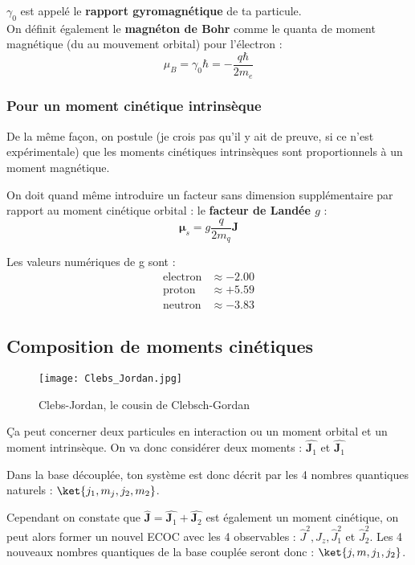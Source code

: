 \documentclass[a4paper]{report}
\begin{document}
$\gamma_0$ est appelé le \textbf{rapport gyromagnétique} de ta particule. \\

On définit également le \textbf{magnéton de Bohr} comme le quanta de moment magnétique (du au mouvement orbital) pour l'électron : 
\begin{equation}
\mu_B=\gamma_0 \hbar= -\dfrac{q \hbar}{2 m_e}
\end{equation}
\subsubsection{Pour un moment cinétique intrinsèque}
De la même façon, on postule (je crois pas qu'il y ait de preuve, si ce n'est expérimentale) que les moments cinétiques intrinsèques sont proportionnels à un moment magnétique.

On doit quand même introduire un facteur sans dimension supplémentaire par rapport au moment cinétique orbital : le \textbf{facteur de Landée $g$} : \begin{equation}
\bm \mu_s= g\dfrac{q}{2m_q} \bm J
\end{equation}

Les valeurs numériques de g sont : \begin{align*}
\mathrm{electron} &\approx -2.00 \\
\mathrm{proton} &\approx +5.59 \\
\mathrm{neutron} &\approx -3.83
\end{align*}

\subsection{Composition de moments cinétiques}
\begin{figure}[h]
\centering
\texttt{[image: Clebs\_Jordan.jpg]}
\caption{Clebs-Jordan, le cousin de Clebsch-Gordan}
\end{figure}
Ça peut concerner deux particules en interaction ou un moment orbital et un moment intrinsèque. On va donc considérer deux moments : $\hat{\bm J_1}$ et $\hat{\bm J_1}$

Dans la base découplée, ton système est donc décrit par les 4 nombres quantiques naturels : $\ket{j_1,m_j,j_2,m_2}$.

Cependant on constate que $\hat{\bm J}=\hat{\bm J_1}+\hat{\bm J_2}$ est également un moment cinétique, on peut alors former un nouvel ECOC avec les 4 observables : $\hat J^2, \hat J_z, \hat J_1^2$ et $\hat J_2^2$. Les 4 nouveaux nombres quantiques de la base couplée seront donc : $\ket{j,m,j_1,j_2}$.
\end{document}
